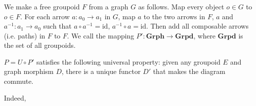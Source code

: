 \documentclass[luatex]{article}
\begin{document}
\subsubsection{}

\showArt

We make a free groupoid $F$ from a graph $G$ as follows. Map every object $o \in G$ to $o \in F$. For each arrow $a : a_0 \rightarrow a_1$ in $G$, map $a$ to the two arrows in $F$, $a$ and $a^{-1} : a_1 \rightarrow a_0$ such that $a \circ a^{-1} = \mathrm{id}$, $a^{-1} \circ a = \mathrm{id}$. Then add all composable arrows (i.e. paths) in $F$ to $F$. We call the mapping $P' : \mathbf{Grph} \rightarrow \mathbf{Grpd}$, where $\mathbf{Grpd}$ is the set of all groupoids.

$P = U \circ P'$ satisfies the following universal property: given any groupoid $E$ and graph morphism $D$, there is a unique functor $D'$ that makes the diagram commute.

\begin{center}
\end{center}

Indeed, 

\subsection{}

\section{}

\section{}

\section{}

\section{}

\section{}
\end{document}

